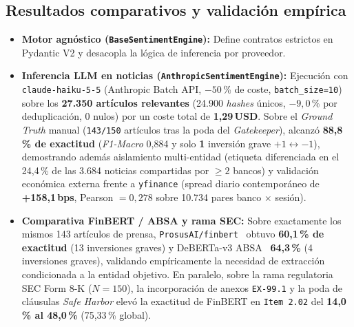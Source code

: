 \subsection{Resultados comparativos y validación empírica}
\begin{itemize}
    \item \textbf{Motor agnóstico (\texttt{BaseSentimentEngine}):} Define contratos estrictos en Pydantic V2 y desacopla la lógica de inferencia por proveedor.
    \item \textbf{Inferencia LLM en noticias (\texttt{AnthropicSentimentEngine}):} Ejecución con \texttt{claude-\allowbreak haiku-5-5} (Anthropic Batch API, $-50$\,\% de coste, \texttt{batch\_size=10}) sobre los \textbf{27.350 artículos relevantes} (24.900 \textit{hashes} únicos, $-9{,}0$\,\% por deduplicación, 0 nulos) por un coste total de \textbf{1,29\,USD}. Sobre el \textit{Ground Truth} manual (\texttt{143/150} artículos tras la poda del \textit{Gatekeeper}), alcanzó \textbf{88,8\,\% de exactitud} (\textit{F1-Macro} 0,884 y solo \textbf{1} inversión grave $+1 \leftrightarrow -1$), demostrando además aislamiento multi-entidad (etiqueta diferenciada en el 24,4\,\% de las 3.684 noticias compartidas por $\ge 2$ bancos) y validación económica externa frente a \texttt{yfinance} (spread diario contemporáneo de \textbf{+158,1\,bps}, Pearson $= 0{,}278$ sobre 10.734 pares banco $\times$ sesión).
    \item \textbf{Comparativa FinBERT / ABSA y rama SEC:} Sobre exactamente los mismos 143 artículos de prensa, \texttt{ProsusAI/finbert}~\cite{araci2019finbert} obtuvo \textbf{60,1\,\% de exactitud} (13 inversiones graves) y DeBERTa-v3 ABSA~\cite{he2021debertav3} \textbf{64,3\,\%} (4 inversiones graves), validando empíricamente la necesidad de extracción condicionada a la entidad objetivo. En paralelo, sobre la rama regulatoria SEC Form 8-K ($N=150$), la incorporación de anexos \texttt{EX-99.1} y la poda de cláusulas \textit{Safe Harbor} elevó la exactitud de FinBERT en \texttt{Item 2.02} del \textbf{14,0\,\% al 48,0\,\%} (75,33\,\% global).
\end{itemize}

